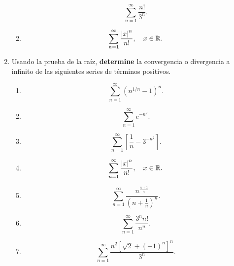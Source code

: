 \documentclass[12pt]{article}
\begin{document}
\begin{enumerate}
\begin{multicols}{2}
\begin{enumerate}
\begin{equation*}
                \sum_{n=1}^{\infty}\frac{n!}{3^n}.
            \end{equation*}
            \item \begin{equation*}
                \sum_{n=1}^{\infty}\frac{\left| x \right|^n}{n!}, \quad x\in\mathbb{R}.
            \end{equation*}
        \end{enumerate}
    \end{multicols}
    \item Usando la prueba de la raíz, \textbf{determine} la convergencia o divergencia a infinito de las siguientes series de términos positivos.
    \begin{multicols}{2}
        \begin{enumerate}
            \item \begin{equation*}
                \sum_{n=1}^{\infty}\left(n^{1/n}-1\right)^n.
            \end{equation*}
            \item \begin{equation*}
                \sum_{n=1}^{\infty}e^{-n^2}.
            \end{equation*}
            \item \begin{equation*}
                \sum_{n=1}^{\infty}\left[\frac{1}{n}-3^{-n^2}\right].
            \end{equation*}
            \item \begin{equation*}
                \sum_{n=1}^{\infty}\frac{\left| x \right|^n}{n!},\quad x\in\mathbb{R}.
            \end{equation*}
            \item \begin{equation*}
                \sum_{n=1}^{\infty}\frac{n^{\frac{n+1}{n}}}{\left(n+\frac{1}{n}\right)^n}.
            \end{equation*}
            \item \begin{equation*}
                \sum_{n=1}^{\infty}\frac{3^nn!}{n^n}.
            \end{equation*}
            \item \begin{equation*}
                \sum_{n=1}^{\infty}\frac{n^2\left[\sqrt{2}+(-1)^n\right]^n}{3^n}.
            \end{equation*}
        \end{enumerate}

\end{multicols}
\end{enumerate}
\end{document}

